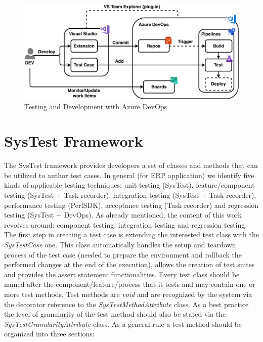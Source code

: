 \begin{figure}[ht]
	\centering
	\includegraphics[scale=0.55]{Images/DevOpsTesting.pdf}
	\caption{Testing and Development with Azure DevOps}
	\label{fig:devOpsTesting}
\end{figure}

\section{SysTest Framework} 

The SysTest framework provides developers a set of classes and methods that can be utilized to author test cases. In general (for ERP application) we identify five kinds of applicable testing techniques: unit testing (SysTest), feature/component testing (SysTest + Task recorder), integration testing (SysTest + Task recorder), performance testing (PerfSDK), acceptance testing (Task recorder) and regression testing (SysTest + DevOps).  As already mentioned, the content of this work revolves around: component testing, integration testing and regression testing. The first step in creating a test case is extending the interested test class with the \textit{SysTestCase} one. This class automatically handles the setup and teardown process of the test case (needed to prepare the environment and rollback the performed changes at the end of the execution), allows the creation of test suites and provides the assert statement functionalities.   Every test class should be named after the component/feature/process that it tests and may contain one or more test methods. Test methods are \textit{void} and are recognized by the system via the decorator reference to the \textit{SysTestMethodAttribute} class. As a best practice the level of granularity of the test method should also be stated via the \textit{SysTestGranularityAttribute} class. As a general rule a test method should be organized into three sections:

